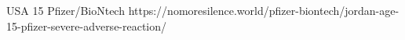           {USA}
          {15}
          {Pfizer/BioNtech}
          {}
          {
          }
          {https://nomoresilence.world/pfizer-biontech/jordan-age-15-pfizer-severe-adverse-reaction/}


